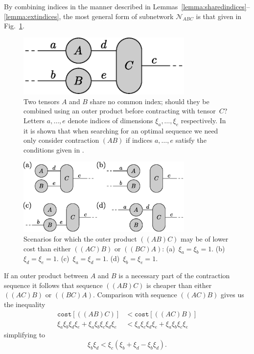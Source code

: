 \documentclass[aps,pre,reprint,superscriptaddress,amsfonts,amsmath,showpacs,nofootinbib,floatfix]{revtex4-1}
\newcommand{\mc}[1]{\mathcal{#1}}
\newcommand{\fref}[1]{Fig.~\ref{#1}}
\newcommand{\pfref}[1]{\protect{Fig.~\ref{#1}}}
\newcommand{\psref}[1]{\protect{Sec.~\ref{#1}}}
\newcommand{\ttt}[1]{\texttt{#1}}
\newcommand{\xa}{\xi_a}
\newcommand{\xb}{\xi_b}
\newcommand{\xc}{\xi_c}
\newcommand{\xd}{\xi_d}
\newcommand{\xe}{\xi_e}
\begin{document}
By combining indices in the manner described in Lemmas~\ref{lemma:sharedindices}--\ref{lemma:extindices}, %
the most general form of subnetwork $\mc{N}_{ABC}$ is that given in \fref{fig:ABop}. 
\begin{figure}
\includegraphics[width=246.0pt]{ABop}
\caption{Two tensors $A$ and $B$ share no common index; should they be combined using an outer product before contracting with tensor~$C$? Letters $a,\ldots,e$ denote indices of dimensions $\xa,\ldots,\xe$ respectively. In \psref{sec:tensorsinOP} it is shown that when searching for an optimal sequence we need only consider contraction $(AB)$ if indices $a,\ldots,e$ satisfy the conditions given in \pfref{fig:ABop1}.\label{fig:ABop}}
\end{figure}%
\begin{figure}
\includegraphics[width=246.0pt]{ABop1}
\caption{Scenarios for which the outer product $((AB)C)$ may be of lower cost than either $((AC)B)$ or $((BC)A)$: (a)~$\xa=\xb=1$. (b)~$\xd=\xe=1$. (c)~$\xa=\xd=1$. (d)~$\xb=\xe=1$.\label{fig:ABop1}}
\end{figure}%
If an outer product between $A$ and $B$ is a necessary part of the contraction sequence it follows that sequence $((AB)C)$ is cheaper than either $((AC)B)$ or $((BC)A)$. Comparison with sequence $((AC)B)$ gives us the inequality
\begin{equation}
\begin{split}
\ttt{cost}[((AB)C)]&<\ttt{cost}[((AC)B)]\\
\xa\xb\xd\xe+\xa\xb\xc\xd\xe&<\xa\xc\xd\xe+\xa\xb\xc\xe
\end{split}\label{eq:ineq1}
\end{equation}
simplifying to
\begin{equation}
\xb\xd<\xc(\xb+\xd-\xb\xd).\label{eq:ABopconstraint1}
\end{equation}
\end{document}
